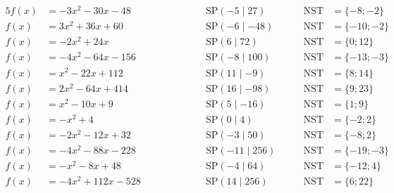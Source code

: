 \documentclass
[
  draft    = true,
  fontsize = 11pt,
  parskip  = half-,
  BCOR     = 0pt,
  DIV      = 11
]
{scrartcl}
\begin{document}
\begin{alignat*}{5}
  f(x)&=-3x^{2}-30x-48 \qquad&\qquad \quad&\text{SP}(-5\mid27) \quad&\quad \text{NST}&=\{-8;-2\} \\[0.5ex]
  f(x)&=3x^{2}+36x+60 \qquad&\qquad \quad&\text{SP}(-6\mid-48) \quad&\quad \text{NST}&=\{-10;-2\} \\[0.5ex]
  f(x)&=-2x^{2}+24x \qquad&\qquad \quad&\text{SP}(6\mid72) \quad&\quad \text{NST}&=\{0;12\} \\[0.5ex]
  f(x)&=-4x^{2}-64x-156 \qquad&\qquad \quad&\text{SP}(-8\mid100) \quad&\quad \text{NST}&=\{-13;-3\} \\[0.5ex]
  f(x)&=x^{2}-22x+112 \qquad&\qquad \quad&\text{SP}(11\mid-9) \quad&\quad \text{NST}&=\{8;14\} \\[0.5ex]
  f(x)&=2x^{2}-64x+414 \qquad&\qquad \quad&\text{SP}(16\mid-98) \quad&\quad \text{NST}&=\{9;23\} \\[0.5ex]
  f(x)&=x^{2}-10x+9 \qquad&\qquad \quad&\text{SP}(5\mid-16) \quad&\quad \text{NST}&=\{1;9\} \\[0.5ex]
  f(x)&=-x^{2}+4 \qquad&\qquad \quad&\text{SP}(0\mid4) \quad&\quad \text{NST}&=\{-2;2\} \\[0.5ex]
  f(x)&=-2x^{2}-12x+32 \qquad&\qquad \quad&\text{SP}(-3\mid50) \quad&\quad \text{NST}&=\{-8;2\} \\[0.5ex]
  f(x)&=-4x^{2}-88x-228 \qquad&\qquad \quad&\text{SP}(-11\mid256) \quad&\quad \text{NST}&=\{-19;-3\} \\[0.5ex]
  f(x)&=-x^{2}-8x+48 \qquad&\qquad \quad&\text{SP}(-4\mid64) \quad&\quad \text{NST}&=\{-12;4\} \\[0.5ex]
  f(x)&=-4x^{2}+112x-528 \qquad&\qquad \quad&\text{SP}(14\mid256) \quad&\quad \text{NST}&=\{6;22\}
\end{alignat*}

\end{document}
